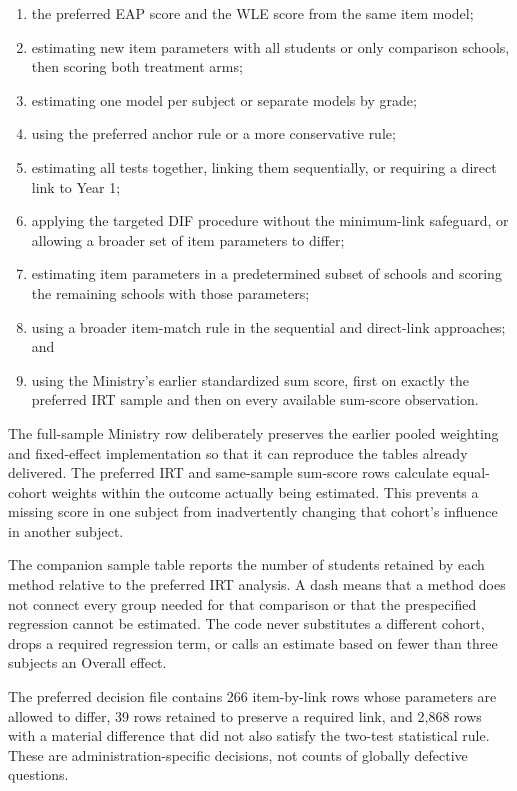 \begin{enumerate}
  \item the preferred EAP score and the WLE score from the same item model;
  \item estimating new item parameters with all students or only comparison
  schools, then scoring both treatment arms;
  \item estimating one model per subject or separate models by grade;
  \item using the preferred anchor rule or a more conservative rule;
  \item estimating all tests together, linking them sequentially, or requiring
  a direct link to Year 1;
  \item applying the targeted DIF procedure without the minimum-link safeguard,
  or allowing a broader set of item parameters to differ;
  \item estimating item parameters in a predetermined subset of schools and
  scoring the remaining schools with those parameters;
  \item using a broader item-match rule in the sequential and direct-link
  approaches; and
  \item using the Ministry's earlier standardized sum score, first on exactly
  the preferred IRT sample and then on every available sum-score observation.
\end{enumerate}

The full-sample Ministry row deliberately preserves the earlier pooled
weighting and fixed-effect implementation so that it can reproduce the tables
already delivered. The preferred IRT and same-sample sum-score rows calculate
equal-cohort weights within the outcome actually being estimated. This prevents
a missing score in one subject from inadvertently changing that cohort's
influence in another subject.

The companion sample table reports the number of students retained by each
method relative to the preferred IRT analysis. A dash means that a method does
not connect every group needed for that comparison or that the prespecified
regression cannot be estimated. The code never substitutes a different cohort,
drops a required regression term, or calls an estimate based on fewer than
three subjects an Overall effect.

The preferred decision file contains 266 item-by-link rows whose parameters
are allowed to differ, 39 rows retained to preserve a required link, and 2,868
rows with a material difference that did not also satisfy the two-test
statistical rule. These are administration-specific decisions, not counts of
globally defective questions.


